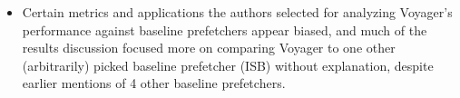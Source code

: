 \documentclass [12pt]{article}
\begin{document}
        \begin{itemize}
            \item Certain metrics and applications the authors selected for analyzing Voyager's performance against baseline prefetchers appear biased, and much of the results discussion focused more on comparing Voyager to one other (arbitrarily) picked baseline prefetcher (ISB) without explanation, despite earlier mentions of 4 other baseline prefetchers.  
            
            


            


            
        \end{itemize}
\end{document}
